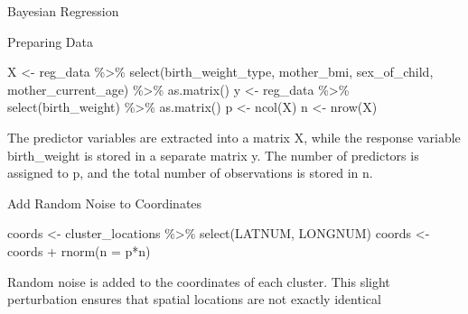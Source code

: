 \documentclass[
  ignorenonframetext,
]{beamer}
\newenvironment{Shaded}{\begin{snugshade}}{\end{snugshade}}
\newcommand{\AttributeTok}[1]{\textcolor[rgb]{0.40,0.45,0.13}{#1}}
\newcommand{\FunctionTok}[1]{\textcolor[rgb]{0.28,0.35,0.67}{#1}}
\newcommand{\NormalTok}[1]{\textcolor[rgb]{0.00,0.23,0.31}{#1}}
\newcommand{\OtherTok}[1]{\textcolor[rgb]{0.00,0.23,0.31}{#1}}
\newcommand{\SpecialCharTok}[1]{\textcolor[rgb]{0.37,0.37,0.37}{#1}}
\begin{document}
\begin{frame}[fragile]{Bayesian Regression}
\label{bayesian-regression}
\begin{block}{Preparing Data}
\label{preparing-data}
\begin{Shaded}
\begin{Highlighting}[]
\NormalTok{X }\OtherTok{\textless{}{-}}\NormalTok{ reg\_data }\SpecialCharTok{\%\textgreater{}\%} \FunctionTok{select}\NormalTok{(birth\_weight\_type, mother\_bmi, sex\_of\_child, mother\_current\_age) }\SpecialCharTok{\%\textgreater{}\%} \FunctionTok{as.matrix}\NormalTok{()}
\NormalTok{y }\OtherTok{\textless{}{-}}\NormalTok{ reg\_data }\SpecialCharTok{\%\textgreater{}\%} \FunctionTok{select}\NormalTok{(birth\_weight) }\SpecialCharTok{\%\textgreater{}\%} \FunctionTok{as.matrix}\NormalTok{()}
\NormalTok{p }\OtherTok{\textless{}{-}} \FunctionTok{ncol}\NormalTok{(X)}
\NormalTok{n }\OtherTok{\textless{}{-}} \FunctionTok{nrow}\NormalTok{(X)}
\end{Highlighting}
\end{Shaded}

The predictor variables are extracted into a matrix X, while the
response variable birth\_weight is stored in a separate matrix y. The
number of predictors is assigned to p, and the total number of
observations is stored in n.
\end{block}

\begin{block}{Add Random Noise to Coordinates}
\label{add-random-noise-to-coordinates}
\begin{Shaded}
\begin{Highlighting}[]
\NormalTok{coords }\OtherTok{\textless{}{-}}\NormalTok{ cluster\_locations }\SpecialCharTok{\%\textgreater{}\%} \FunctionTok{select}\NormalTok{(LATNUM, LONGNUM) }
\NormalTok{coords }\OtherTok{\textless{}{-}}\NormalTok{ coords }\SpecialCharTok{+} \FunctionTok{rnorm}\NormalTok{(}\AttributeTok{n =}\NormalTok{ p}\SpecialCharTok{*}\NormalTok{n)}
\end{Highlighting}
\end{Shaded}

Random noise is added to the coordinates of each cluster. This slight
perturbation ensures that spatial locations are not exactly identical
\end{block}
\end{frame}
\end{document}
